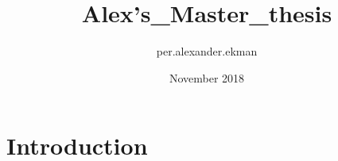 \documentclass{article}
\title{Alex's_Master_thesis}
\author{per.alexander.ekman }
\date{November 2018}
\begin{document}
\maketitle

\section{Introduction}
\end{document}
